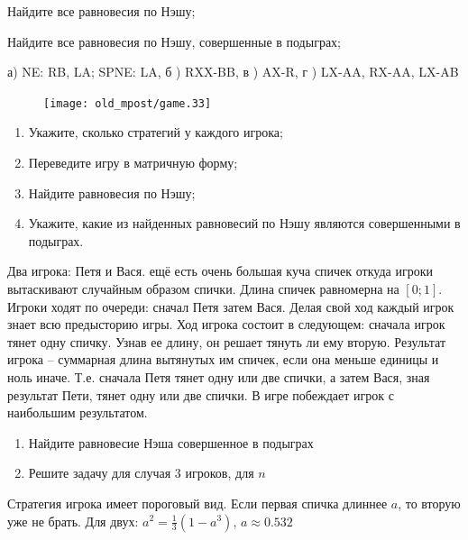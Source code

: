 \begin{problem}
Найдите все равновесия по Нэшу;\par
Найдите все равновесия по Нэшу, совершенные в подыграх;



\begin{sol}
 а)  NE: RB, LA; SPNE: LA, б ) RXX-BB, в ) AX-R, г ) LX-AA, RX-AA, LX-AB
\end{sol}
\end{problem}



\begin{problem}
\begin{figure}[htbp]
     \texttt{[image: old\_mpost/game.33]}
\end{figure}\par
\begin{enumerate}
\item  Укажите, сколько стратегий у каждого игрока;\par
\item Переведите игру в матричную форму;\par
\item Найдите равновесия по Нэшу;\par
\item Укажите, какие из найденных равновесий по Нэшу являются совершенными в подыграх.
\end{enumerate}
\begin{sol}
\end{sol}
\end{problem}





\begin{problem}
Два игрока: Петя и Вася. ещё есть очень большая куча спичек откуда игроки вытаскивают случайным образом спички. Длина спичек равномерна на $[0;1]$. Игроки ходят по очереди: сначал Петя затем Вася. Делая свой ход каждый игрок знает всю предысторию игры. Ход игрока состоит в следующем: сначала игрок тянет одну спичку. Узнав ее длину, он решает тянуть ли ему вторую. Результат игрока -- суммарная длина вытянутых им спичек, если она меньше единицы и ноль иначе. Т.е. сначала Петя тянет одну или две спички, а затем Вася, зная результат Пети, тянет одну или две спички. В игре побеждает игрок с наибольшим результатом.
\begin{enumerate}
\item Найдите равновесие Нэша совершенное в подыграх
\item Решите задачу для случая 3 игроков, для $n$
\end{enumerate}




\begin{sol}
Стратегия игрока имеет пороговый вид. Если первая спичка длиннее $a$, то вторую уже не брать. Для двух: $a^{2}=\frac{1}{3}(1-a^{3})$, $a\approx 0.532$
\end{sol}
\end{problem}






